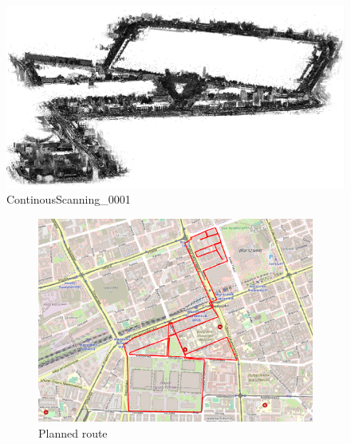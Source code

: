 \documentclass[a4paper,12pt]{book}
\begin{document}
\begin{enumerate}
	\begin{figure}[H]
		\includegraphics[width=1\linewidth]{cloud1}
		\caption{ContinousScanning\_0001}
	\end{figure}
	\begin{figure}[H]
		\centering
		\begin{subfigure}{.88\textwidth}
			\centering
			\includegraphics[width=1\linewidth]{route_p1}
			\caption{Planned route}
			\label{fig:a1}
		\end{subfigure}%
		\linebreak
		\begin{subfigure}{.88\textwidth}
			\centering

\end{subfigure}
\end{figure}
\end{enumerate}
\end{document}
